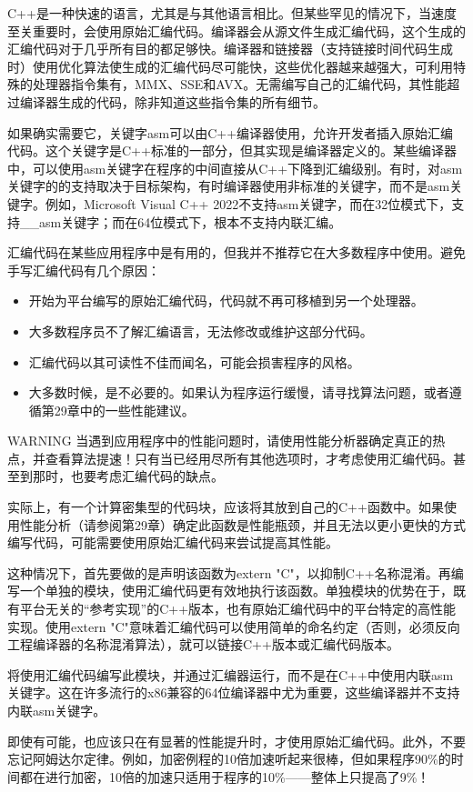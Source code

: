 
C++是一种快速的语言，尤其是与其他语言相比。但某些罕见的情况下，当速度至关重要时，会使用原始汇编代码。编译器会从源文件生成汇编代码，这个生成的汇编代码对于几乎所有目的都足够快。编译器和链接器（支持链接时间代码生成时）使用优化算法使生成的汇编代码尽可能快，这些优化器越来越强大，可利用特殊的处理器指令集有，MMX、SSE和AVX。无需编写自己的汇编代码，其性能超过编译器生成的代码，除非知道这些指令集的所有细节。

如果确实需要它，关键字asm可以由C++编译器使用，允许开发者插入原始汇编代码。这个关键字是C++标准的一部分，但其实现是编译器定义的。某些编译器中，可以使用asm关键字在程序的中间直接从C++下降到汇编级别。有时，对asm关键字的的支持取决于目标架构，有时编译器使用非标准的关键字，而不是asm关键字。例如，Microsoft Visual C++ 2022不支持asm关键字，而在32位模式下，支持\_\_asm关键字；而在64位模式下，根本不支持内联汇编。

汇编代码在某些应用程序中是有用的，但我并不推荐它在大多数程序中使用。避免手写汇编代码有几个原因：

\begin{itemize}
\item
开始为平台编写的原始汇编代码，代码就不再可移植到另一个处理器。

\item
大多数程序员不了解汇编语言，无法修改或维护这部分代码。

\item
汇编代码以其可读性不佳而闻名，可能会损害程序的风格。

\item
大多数时候，是不必要的。如果认为程序运行缓慢，请寻找算法问题，或者遵循第29章中的一些性能建议。
\end{itemize}

\begin{myWarning}{WARNING}
当遇到应用程序中的性能问题时，请使用性能分析器确定真正的热点，并查看算法提速！只有当已经用尽所有其他选项时，才考虑使用汇编代码。甚至到那时，也要考虑汇编代码的缺点。
\end{myWarning}

实际上，有一个计算密集型的代码块，应该将其放到自己的C++函数中。如果使用性能分析（请参阅第29章）确定此函数是性能瓶颈，并且无法以更小更快的方式编写代码，可能需要使用原始汇编代码来尝试提高其性能。

这种情况下，首先要做的是声明该函数为extern "C"，以抑制C++名称混淆。再编写一个单独的模块，使用汇编代码更有效地执行该函数。单独模块的优势在于，既有平台无关的“参考实现”的C++版本，也有原始汇编代码中的平台特定的高性能实现。使用extern "C"意味着汇编代码可以使用简单的命名约定（否则，必须反向工程编译器的名称混淆算法），就可以链接C++版本或汇编代码版本。

将使用汇编代码编写此模块，并通过汇编器运行，而不是在C++中使用内联asm关键字。这在许多流行的x86兼容的64位编译器中尤为重要，这些编译器并不支持内联asm关键字。

即使有可能，也应该只在有显著的性能提升时，才使用原始汇编代码。此外，不要忘记阿姆达尔定律。例如，加密例程的10倍加速听起来很棒，但如果程序90\%的时间都在进行加密，10倍的加速只适用于程序的10\%——整体上只提高了9\%！





